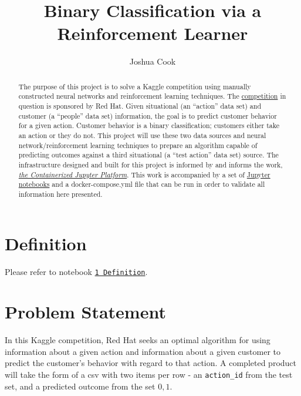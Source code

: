 \documentclass[]{report}
\title{Binary Classification via a Reinforcement Learner}
\author{Joshua Cook}
\date{}
\begin{document}
\maketitle

\begin{abstract}
{The purpose of this project is to solve a Kaggle competition using
manually constructed neural networks and reinforcement learning
techniques. The
\href{https://www.kaggle.com/c/predicting-red-hat-business-value}{competition}
in question is sponsored by Red Hat. Given situational (an ``action''
data set) and customer (a ``people'' data set) information, the goal is
to predict customer behavior for a given action. Customer behavior is a
binary classification; customers either take an action or they do not.
This project will use these two data sources and neural
network/reinforcement learning techniques to prepare an algorithm
capable of predicting outcomes against a third situational (a ``test
action'' data set) source. The infrastructure designed and built for
this project is informed by and informs the work,
\href{https://leanpub.com/thecontainerizedjupyterplatform}{\emph{the
Containerized Jupyter Platform}}. This work is accompanied by a set of
\href{http://joshuacook.me:8003/tree/ipynb}{Jupyter notebooks} and a
docker-compose.yml file that can be run in order to validate all
information here presented.}
\end{abstract}


{
\hypersetup{linkcolor=black}
\setcounter{tocdepth}{2}
\tableofcontents
}
\chapter{Definition}

Please refer to notebook
\href{http://joshuacook.me:8003/notebooks/ipynb/1\%20Definition.ipynb}{\texttt{1\ Definition}}.

\chapter{Problem Statement}\label{problem-statement}

In this Kaggle competition, Red Hat seeks an optimal algorithm for using
information about a given action and information about a given customer
to predict the customer's behavior with regard to that action. A
completed product will take the form of a csv with two items per row -
an \texttt{action\_id} from the test set, and a predicted outcome from
the set \({0,1}\).
\end{document}

